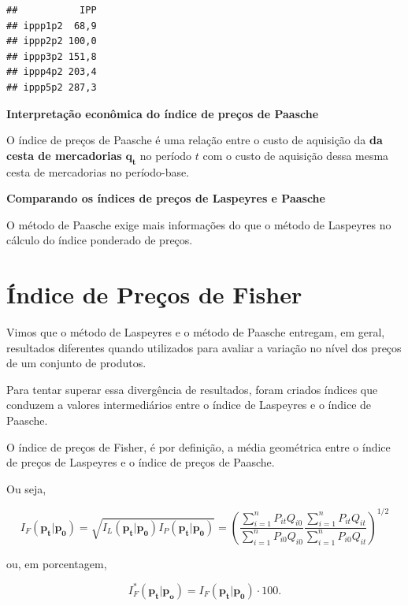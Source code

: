 \documentclass[
]{book}
\begin{document}
\begin{verbatim}
##           IPP
## ippp1p2  68,9
## ippp2p2 100,0
## ippp3p2 151,8
## ippp4p2 203,4
## ippp5p2 287,3
\end{verbatim}

\textbf{Interpretação econômica do índice de preços de Paasche}

O índice de preços de Paasche é uma relação entre o custo de aquisição da \textbf{da cesta de mercadorias} \(\mathbf{q_t}\) no período \(t\) com o custo de aquisição dessa mesma
cesta de mercadorias no período-base.

\textbf{Comparando os índices de preços de Laspeyres e Paasche}

O método de Paasche exige mais informações do que o método de Laspeyres no cálculo
do índice ponderado de preços.

\hypertarget{uxedndice-de-preuxe7os-de-fisher}{%
\section{Índice de Preços de Fisher}\label{uxedndice-de-preuxe7os-de-fisher}}

Vimos que o método de Laspeyres e o método de Paasche entregam, em geral, resultados
diferentes quando utilizados para avaliar a variação no nível dos preços de um conjunto
de produtos.

Para tentar superar essa divergência de resultados, foram criados índices que conduzem
a valores intermediários entre o índice de Laspeyres e o índice de Paasche.

O índice de preços de Fisher, é por definição, a média geométrica entre o índice de
preços de Laspeyres e o índice de preços de Paasche.

Ou seja,

\begin{equation}
  I_F(\mathbf{p_t}| \mathbf{p_0}) = \sqrt{I_L(\mathbf{p_t}| \mathbf{p_0}) I_P(\mathbf{p_t}| \mathbf{p_0})}=  \left( \frac{\sum_{i=1}^{n}P_{it}Q_{i0}}{\sum_{i=1}^{n}P_{i0}Q_{i0}} \frac{\sum_{i=1}^{n}P_{it}Q_{it}}{\sum_{i=1}^{n}P_{i0}Q_{it}}\right)^{1/2}
  \label{eq:IndicePrecosFischer}
\end{equation}

ou, em porcentagem,

\begin{equation}
  I_F^*(\mathbf{p_t}|\mathbf{p_{o}}) = I_F(\mathbf{p_t}| \mathbf{p_0}) \cdot 100.
  \label{eq:IndicePrecosFischerEmPorcentagem}
\end{equation}
\end{document}
